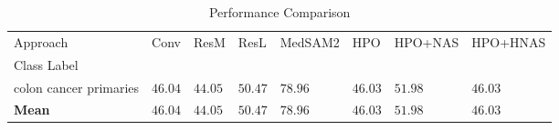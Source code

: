 \begin{table}
\caption{Performance Comparison}
\label{tab:results}
\begin{tabular}{llllllll}
\toprule
Approach & Conv & ResM & ResL & MedSAM2 & HPO & HPO+NAS & HPO+HNAS \\
Class Label &  &  &  &  &  &  &  \\
\midrule
colon cancer primaries & $46.04$ & $44.05$ & $50.47$ & $\mathbf{78.96}$ & $46.03$ & $51.98$ & $46.03$ \\
\textbf{Mean} & $46.04$ & $44.05$ & $50.47$ & $\mathbf{78.96}$ & $46.03$ & $51.98$ & $46.03$ \\
\bottomrule
\end{tabular}
\end{table}
